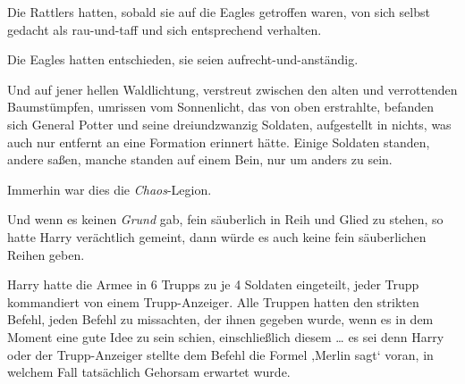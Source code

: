 Die Rattlers hatten, sobald sie auf die Eagles getroffen waren, von sich selbst gedacht als rau-und-taff und sich entsprechend verhalten.

Die Eagles hatten entschieden, sie seien aufrecht-und-anständig.

Und auf jener hellen Waldlichtung, verstreut zwischen den alten und verrottenden Baumstümpfen, umrissen vom Sonnenlicht, das von oben erstrahlte, befanden sich General Potter und seine dreiundzwanzig Soldaten, aufgestellt in nichts, was auch nur entfernt an eine Formation erinnert hätte. Einige Soldaten standen, andere saßen, manche standen auf einem Bein, nur um anders zu sein.

Immerhin war dies die \emph{Chaos}-Legion.

Und wenn es keinen \emph{Grund} gab, fein säuberlich in Reih und Glied zu stehen, so hatte Harry verächtlich gemeint, dann würde es auch keine fein säuberlichen Reihen geben.

Harry hatte die Armee in 6 Trupps zu je 4 Soldaten eingeteilt, jeder Trupp kommandiert von einem Trupp-Anzeiger. Alle Truppen hatten den strikten Befehl, jeden Befehl zu missachten, der ihnen gegeben wurde, wenn es in dem Moment eine gute Idee zu sein schien, einschließlich diesem … es sei denn Harry oder der Trupp-Anzeiger stellte dem Befehl die Formel ‚Merlin sagt‘ voran, in welchem Fall tatsächlich Gehorsam erwartet wurde.%

